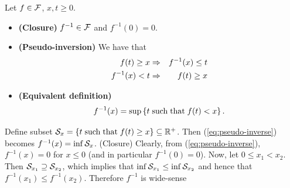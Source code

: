 \begin{theorem}
Let $f \in \mathcal F$, $x,t \geq 0$.
\begin{itemize}
\item{\textbf{(Closure)}  $f^{-1} \in \mathcal F$ and $f^{-1}(0) = 0$.}
\item{\textbf{(Pseudo-inversion)} %
We have that
\begin{eqnarray}
\mylabel{eq:pseudo-inverse(i)}
f(t) \geq x & \Rightarrow & f^{-1}(x) \leq t \\
\mylabel{eq:pseudo-inverse(ii)}
f^{-1}(x) < t & \Rightarrow & f(t) \geq x  %
\end{eqnarray}
}
\item{\textbf{(Equivalent definition)}
\begin{equation}
\mylabel{eq:dualpseudo-inverse}
f^{-1}(x) = \sup \left\{ t  \mst f(t) < x \right\}.
\end{equation}
}
\end{itemize}
\end{theorem}
\pr Define subset $\mathcal S_{x} = \left\{ t \mathrm{\; such \; that \; } f(t) \geq x \right\}
\subseteq \mathbb{R}^{+}$. Then (\ref{eq:pseudo-inverse}) becomes $
f^{-1}(x) = \inf \mathcal S_{x} $. \vspace{1ex} \noindent (Closure)
Clearly, from (\ref{eq:pseudo-inverse}), $f^{-1}(x) = 0$ for $x
\leq 0$ (and in particular $f^{-1}(0) = 0$). Now, let $0 \leq x_1
< x_2 $. Then $\mathcal S_{x_1} \supseteq \mathcal S_{x_2}$, which implies
that $ \inf \mathcal S_{x_1} \leq \inf \mathcal S_{x_2} $ and hence that $
f^{-1}(x_1) \leq  f^{-1}(x_2) $. Therefore $f^{-1}$ is wide-sense
